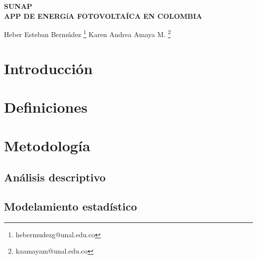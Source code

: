 \documentclass[11pt,twoside]{article}
\date{}
\begin{document}
	
	{
		\fancyhead[L]{}
		\fancyfoot[LO,RE]{}
		\fancyfoot[LE,RO]{ \vspace{10pt}\thepage}
		\renewcommand{\headrulewidth}{0pt}
		\renewcommand{\footrulewidth}{0pt}
	}
	
	\thispagestyle{firststyle}
	\begin{center}
		\Large{{\bf SUNAP\\
				\vspace{20pt}   APP DE ENERGíA FOTOVOLTAÍCA EN COLOMBIA\\ 
				\vspace{10pt}}}
	\end{center}
	
	{\normalsize{
			Heber Esteban Bermúdez			\footnote{\footnotesize{ hebermudezg@unal.edu.co}}
			Karen Andrea Amaya M.	\footnote{\footnotesize{kaamayam@unal.edu.co}}
	}}
	
	
	
	
	
	\begin{abstract}
	
	\end{abstract}
	
	
	
	\section{Introducción}
	\section{Definiciones}
	\section{Metodología}
	\subsection{Análisis descriptivo}
	
	
	
	
	
	\subsection{Modelamiento estadístico}
\end{document}
